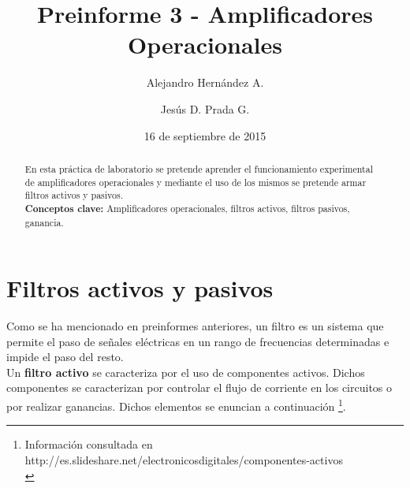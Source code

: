 \documentclass[prb,aps,preprintnumbers,amsmath,amssymb]{revtex4}
\begin{document}
\title{Preinforme 3 - Amplificadores Operacionales}%

\author{Alejandro Hernández A.}%
\author{Jesús D. Prada G.}%
%

\date{16 de septiembre de 2015}%

\begin{abstract}
En esta práctica de laboratorio se pretende aprender el funcionamiento experimental de amplificadores operacionales y mediante el uso de los mismos se pretende armar filtros activos y pasivos.\\

\noindent \textbf{Conceptos clave:} Amplificadores operacionales, filtros activos, filtros pasivos, ganancia.
\end{abstract}
                             
\maketitle

\section{Filtros activos y pasivos}
Como se ha mencionado en preinformes anteriores, un filtro es un sistema que permite el paso de señales eléctricas en un rango de
frecuencias determinadas e impide el paso del resto.\\

Un \textbf{filtro activo} se caracteriza por el uso de componentes activos. Dichos componentes se caracterizan por controlar el flujo de corriente en los circuitos o por realizar ganancias. Dichos elementos se enuncian a continuación \footnote{Información consultada en http://es.slideshare.net/electronicosdigitales/componentes-activos\\}.
\end{document}
